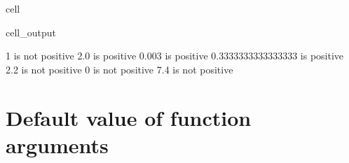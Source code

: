 \documentclass[letterpaper,10pt,english]{jupyterBook}
\begin{document}
\begin{sphinxuseclass}{cell}
\begin{sphinxVerbatimOutput}
\begin{sphinxuseclass}{cell_output}
\begin{sphinxVerbatim}[commandchars=\\\{\}]
\PYGZhy{}1 is not positive
2.0 is positive
0.003 is positive
0.3333333333333333 is positive
\PYGZhy{}2.2 is not positive
0 is not positive
\PYGZhy{}7.4 is not positive
\end{sphinxVerbatim}

\end{sphinxuseclass}\end{sphinxVerbatimOutput}

\end{sphinxuseclass}

\section{Default value of function arguments}
\label{\detokenize{ch/programming/functions:default-value-of-function-arguments}}
\end{document}
